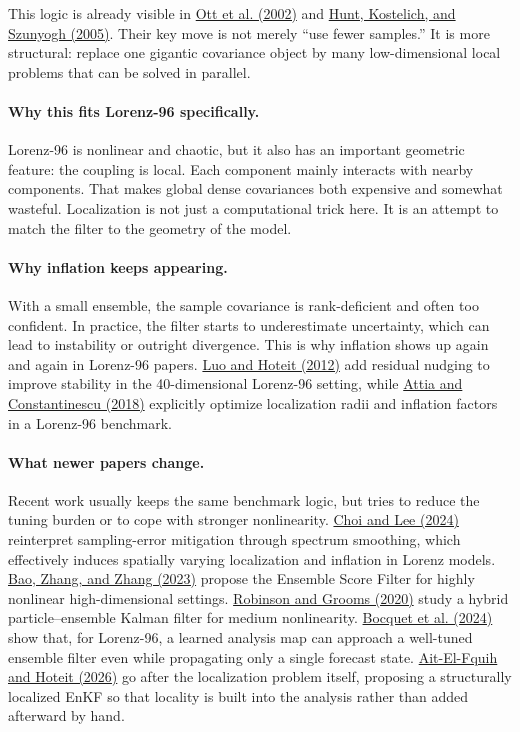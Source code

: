\documentclass[12pt,a4paper]{article}
\begin{document}
This logic is already visible in \href{https://arxiv.org/abs/physics/0203058}{Ott et al. (2002)} and \href{https://arxiv.org/abs/physics/0511236}{Hunt, Kostelich, and Szunyogh (2005)}. Their key move is not merely ``use fewer samples.'' It is more structural: replace one gigantic covariance object by many low-dimensional local problems that can be solved in parallel.

\paragraph{Why this fits Lorenz-96 specifically.}
Lorenz-96 is nonlinear and chaotic, but it also has an important geometric feature: the coupling is local. Each component mainly interacts with nearby components. That makes global dense covariances both expensive and somewhat wasteful. Localization is not just a computational trick here. It is an attempt to match the filter to the geometry of the model.

\paragraph{Why inflation keeps appearing.}
With a small ensemble, the sample covariance is rank-deficient and often too confident. In practice, the filter starts to underestimate uncertainty, which can lead to instability or outright divergence. This is why inflation shows up again and again in Lorenz-96 papers. \href{https://arxiv.org/abs/1210.1318}{Luo and Hoteit (2012)} add residual nudging to improve stability in the 40-dimensional Lorenz-96 setting, while \href{https://arxiv.org/abs/1806.10655}{Attia and Constantinescu (2018)} explicitly optimize localization radii and inflation factors in a Lorenz-96 benchmark.

\paragraph{What newer papers change.}
Recent work usually keeps the same benchmark logic, but tries to reduce the tuning burden or to cope with stronger nonlinearity. \href{https://arxiv.org/abs/2404.00154}{Choi and Lee (2024)} reinterpret sampling-error mitigation through spectrum smoothing, which effectively induces spatially varying localization and inflation in Lorenz models. \href{https://arxiv.org/abs/2309.00983}{Bao, Zhang, and Zhang (2023)} propose the Ensemble Score Filter for highly nonlinear high-dimensional settings. \href{https://arxiv.org/abs/2006.04699}{Robinson and Grooms (2020)} study a hybrid particle--ensemble Kalman filter for medium nonlinearity. \href{https://arxiv.org/abs/2408.04739}{Bocquet et al. (2024)} show that, for Lorenz-96, a learned analysis map can approach a well-tuned ensemble filter even while propagating only a single forecast state. \href{https://arxiv.org/abs/2603.03926}{Ait-El-Fquih and Hoteit (2026)} go after the localization problem itself, proposing a structurally localized EnKF so that locality is built into the analysis rather than added afterward by hand.
\end{document}
